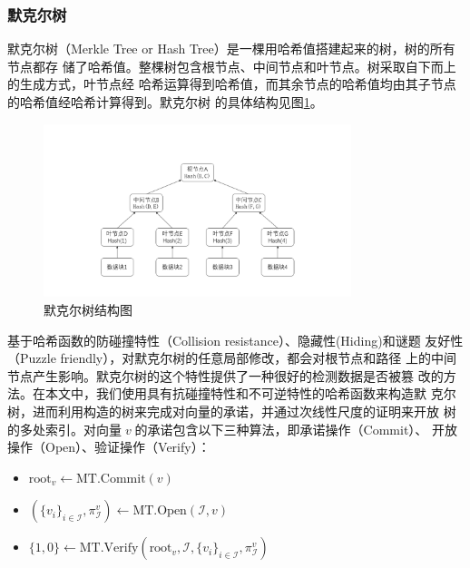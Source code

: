 \documentclass[zihao=-4]{ctexart}
\begin{document}
\begin{spacing}{1.5}
\subsubsection{默克尔树}
默克尔树（Merkle Tree or Hash Tree）是一棵用哈希值搭建起来的树，树的所有节点都存
储了哈希值。整棵树包含根节点、中间节点和叶节点。树采取自下而上的生成方式，叶节点经
哈希运算得到哈希值，而其余节点的哈希值均由其子节点的哈希值经哈希计算得到。默克尔树
的具体结构见图\ref{Merkle}。
\begin{figure}[H]
  \centering
  \includegraphics[width=0.8\textwidth]{Merkle_tree.bmp} 
  \caption{默克尔树结构图}
  \label{Merkle}
\end{figure}
基于哈希函数的防碰撞特性（Collision resistance）、隐藏性(Hiding)和谜题
友好性（Puzzle friendly），对默克尔树的任意局部修改，都会对根节点和路径
上的中间节点产生影响。默克尔树的这个特性提供了一种很好的检测数据是否被篡
改的方法。在本文中，我们使用具有抗碰撞特性和不可逆特性的哈希函数来构造默
克尔树，进而利用构造的树来完成对向量的承诺，并通过次线性尺度的证明来开放
树的多处索引。对向量$\;v\;$的承诺包含以下三种算法，即承诺操作（Commit）、
开放操作（Open）、验证操作（Verify）：
\begin{itemize}
  \item $\text{root}_v\leftarrow \text{MT.Commit}(v)$
  \item $(\{v_i\}_{i\in\mathcal{I}},\pi^v_{\mathcal{I}})\leftarrow\text{MT.Open}(\mathcal{I},v)$
  \item $\{1,0\}\leftarrow\text{MT.Verify}(\text{root}_v,\mathcal{I},\{v_i\}_{i\in\mathcal{I}},\pi^v_{\mathcal{I}})$
\end{itemize}


\end{spacing}
\end{document}
